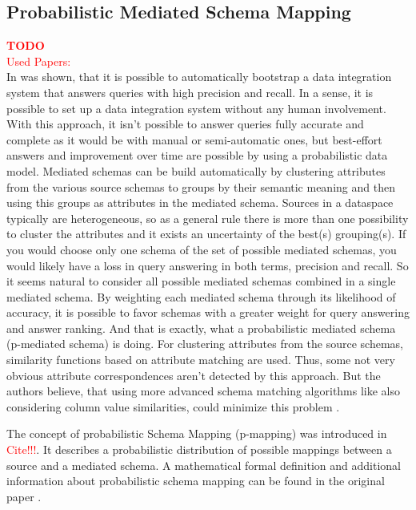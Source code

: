 \subsection{Probabilistic Mediated Schema Mapping}
\textcolor{red}{\textbf{TODO}}\\
\textcolor{red}{Used Papers: \cite{DasSarma:2008:BPD:1376616.1376702}}\\

In \cite{DasSarma:2008:BPD:1376616.1376702} was shown, that it is possible to automatically bootstrap a data integration system that answers queries with high precision and recall. In a sense, it is possible to set up a data integration system without any human involvement. With this approach, it isn't possible to answer queries fully accurate and complete as it would be with manual or semi-automatic ones, but best-effort answers and improvement over time are possible by using a probabilistic data model. 
Mediated schemas can be build automatically by clustering attributes from the various source schemas to groups by their semantic meaning and then using this groups as attributes in the mediated schema. Sources in a dataspace typically are heterogeneous, so as a general rule there is more than one possibility to cluster the attributes and it exists an uncertainty of the best(s) grouping(s). If you would choose only one schema of the set of possible mediated schemas, you would likely have a loss in query answering in both terms, precision and recall.  So it seems natural to consider all possible mediated schemas combined in a single mediated schema. By weighting each mediated schema through its likelihood of accuracy, it is possible to favor schemas with a greater weight for query answering and answer ranking. And that is exactly, what a probabilistic mediated schema (p-mediated schema) is doing.
For clustering attributes from the source schemas, similarity functions based on attribute matching are used. Thus, some not very obvious attribute correspondences aren't detected by this approach. But the authors believe, that using more advanced schema matching algorithms like also considering column value similarities, could minimize this problem \cite{DasSarma:2008:BPD:1376616.1376702}.

The concept of probabilistic Schema Mapping (p-mapping) was introduced in \textcolor{red}{Cite!!!}. It describes a probabilistic distribution of possible mappings between a source and a mediated schema. A mathematical formal definition and additional information about probabilistic schema mapping can be found in the original paper \cite{DasSarma:2008:BPD:1376616.1376702}.
 
